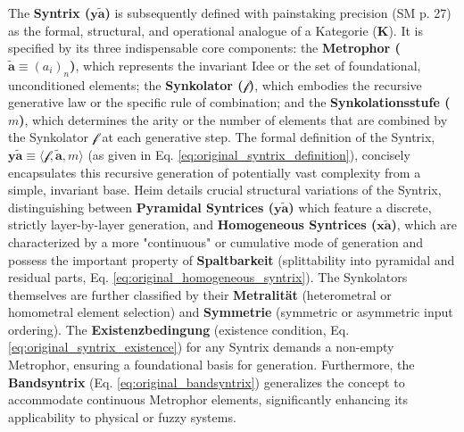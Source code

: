 \documentclass[12pt]{article}
\newcommand{\kategorie}{\bm{K}}
\newcommand{\syntrix}{\bm{y\widetilde{a}}}
\newcommand{\homogeneoussyntrix}{\bm{x\widetilde{a}}}
\newcommand{\metrophor}{\bm{\widetilde{a}}}
\newcommand{\synkolator}{\mathcal{f}}
\newcommand{\synkolationsstufe}{m}
\begin{document}
The \textbf{Syntrix (\(\syntrix\))} is subsequently defined with painstaking precision (SM p. 27) as the formal, structural, and operational analogue of a Kategorie (\(\kategorie\)). It is specified by its three indispensable core components: the \textbf{Metrophor (\( \metrophor \equiv (a_i)_n \))}, which represents the invariant Idee or the set of foundational, unconditioned elements; the \textbf{Synkolator (\( \synkolator \))}, which embodies the recursive generative law or the specific rule of combination; and the \textbf{Synkolationsstufe (\( \synkolationsstufe \))}, which determines the arity or the number of elements that are combined by the Synkolator \( \synkolator \) at each generative step. The formal definition of the Syntrix, \( \syntrix \equiv \langle \synkolator, \metrophor, \synkolationsstufe \rangle \) (as given in Eq. \eqref{eq:original_syntrix_definition}), concisely encapsulates this recursive generation of potentially vast complexity from a simple, invariant base. Heim details crucial structural variations of the Syntrix, distinguishing between \textbf{Pyramidal Syntrices (\( \syntrix \))} which feature a discrete, strictly layer-by-layer generation, and \textbf{Homogeneous Syntrices (\( \homogeneoussyntrix \))}, which are characterized by a more "continuous" or cumulative mode of generation and possess the important property of \textbf{Spaltbarkeit} (splittability into pyramidal and residual parts, Eq. \eqref{eq:original_homogeneous_syntrix}). The Synkolators themselves are further classified by their \textbf{Metralität} (heterometral or homometral element selection) and \textbf{Symmetrie} (symmetric or asymmetric input ordering). The \textbf{Existenzbedingung} (existence condition, Eq. \eqref{eq:original_syntrix_existence}) for any Syntrix demands a non-empty Metrophor, ensuring a foundational basis for generation. Furthermore, the \textbf{Bandsyntrix} (Eq. \eqref{eq:original_bandsyntrix}) generalizes the concept to accommodate continuous Metrophor elements, significantly enhancing its applicability to physical or fuzzy systems.
\end{document}
